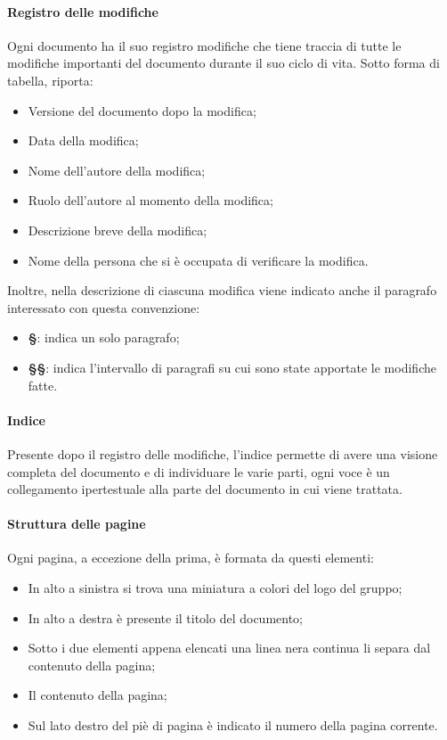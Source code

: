 \paragraph{Registro delle modifiche}
Ogni documento ha il suo registro modifiche che tiene traccia di tutte le modifiche importanti del documento durante il suo ciclo di vita.
Sotto forma di tabella, riporta:
  \begin{itemize}
  		\item Versione del documento dopo la modifica;
  		\item Data della modifica;
  		\item Nome dell’autore della modifica;
  		\item Ruolo dell’autore al momento della modifica;
  		\item Descrizione breve della modifica;
  		\item Nome della persona che si è occupata di verificare la modifica.
	\end{itemize}

Inoltre, nella descrizione di ciascuna modifica viene indicato anche il paragrafo interessato con questa convenzione: 
\begin{itemize}
    \item \textbf{\S{}}: indica un solo paragrafo;
    \item \textbf{\S{}\S{}}: indica l'intervallo di paragrafi su cui sono state apportate le modifiche fatte.
\end{itemize}

\paragraph{Indice}
Presente dopo il registro delle modifiche, l’indice permette di avere una visione completa del documento e di individuare le varie parti, ogni voce è un collegamento ipertestuale alla parte del documento in cui viene trattata.

\paragraph{Struttura delle pagine}
Ogni pagina, a eccezione della prima, è formata da questi elementi:
  \begin{itemize}
  		\item In alto a sinistra si trova una miniatura a colori del logo del gruppo;
  		\item In alto a destra è presente il titolo del documento;
  		\item Sotto i due elementi appena elencati una linea nera continua li separa dal contenuto della pagina;
  		\item Il contenuto della pagina;
  		\item Sul lato destro del piè di pagina è indicato il numero della pagina corrente.
	\end{itemize}
	
